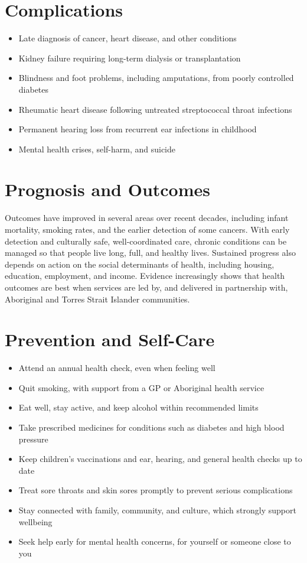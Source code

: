 \section*{Complications}
\begin{itemize}
    \item Late diagnosis of cancer, heart disease, and other conditions
    \item Kidney failure requiring long-term dialysis or transplantation
    \item Blindness and foot problems, including amputations, from poorly controlled diabetes
    \item Rheumatic heart disease following untreated streptococcal throat infections
    \item Permanent hearing loss from recurrent ear infections in childhood
    \item Mental health crises, self-harm, and suicide
\end{itemize}

\section*{Prognosis and Outcomes}
Outcomes have improved in several areas over recent decades, including infant mortality, smoking rates, and the earlier detection of some cancers. With early detection and culturally safe, well-coordinated care, chronic conditions can be managed so that people live long, full, and healthy lives. Sustained progress also depends on action on the social determinants of health, including housing, education, employment, and income. Evidence increasingly shows that health outcomes are best when services are led by, and delivered in partnership with, Aboriginal and Torres Strait Islander communities.

\section*{Prevention and Self-Care}
\begin{itemize}
    \item Attend an annual health check, even when feeling well
    \item Quit smoking, with support from a GP or Aboriginal health service
    \item Eat well, stay active, and keep alcohol within recommended limits
    \item Take prescribed medicines for conditions such as diabetes and high blood pressure
    \item Keep children's vaccinations and ear, hearing, and general health checks up to date
    \item Treat sore throats and skin sores promptly to prevent serious complications
    \item Stay connected with family, community, and culture, which strongly support wellbeing
    \item Seek help early for mental health concerns, for yourself or someone close to you
\end{itemize}

